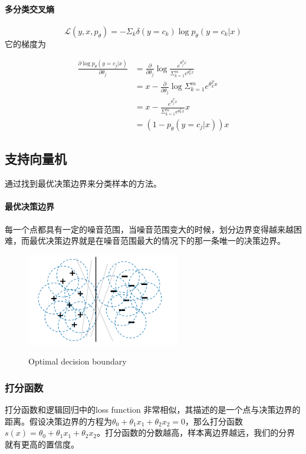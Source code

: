 \paragraph{多分类交叉熵}
$$\mathcal L(y,x,p_\theta) = -\Sigma_k \delta(y=c_k)\log p_\theta(y=c_k|x)$$
它的梯度为

\begin{equation}
\nonumber
  \begin{aligned}
    \displaystyle \frac{\partial\log p_\theta(y=c_j|x)}{\partial \theta_j} & = \frac{\partial}{\partial\theta_j}\log \frac{e^{\theta_j^Tx}}{\Sigma_{k=1}^me^{\theta_k^Tx}} \\
    &= x - \frac{\partial}{\partial\theta_j}\log \Sigma_{k=1}^m e^{\theta^T_kx} \\
    & = x - \frac{e^{\theta_j^Tx}}{\Sigma_{k=1}^m e^{\theta_k^T x}}x \\
    & = (1-p_\theta(y=c_j|x))x
  \end{aligned}
\end{equation}


\subsection{支持向量机}
通过找到最优决策边界来分类样本的方法。
\paragraph{最优决策边界}
每一个点都具有一定的噪音范围，当噪音范围变大的时候，划分边界变得越来越困难，而最优决策边界就是在噪音范围最大的情况下的那一条唯一的决策边界。

\begin{figure}[h]
\centering
  \includegraphics[width = 0.6\textwidth]{ref/border}
  \label{border}
  \caption{Optimal decision boundary}
\end{figure}

\subsubsection{打分函数}
打分函数和逻辑回归中的loss function 非常相似，其描述的是一个点与决策边界的距离。假设决策边界的方程为$\theta_0 + \theta_1x_1 + \theta_2x_2 = 0$，那么打分函数$s(x) = \theta_0 + \theta_1x_1 + \theta_2x_2$。打分函数的分数越高，样本离边界越远，我们的分界就有更高的置信度。


